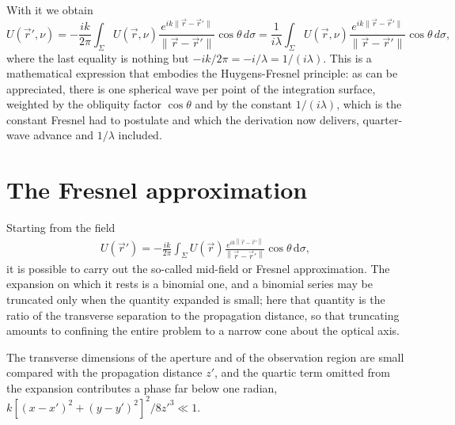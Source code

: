 		With it we obtain
		\begin{equation}\label{eq:RSfinal}
			U(\vec{r}',\nu) = -\dfrac{ik}{2\pi} \int_{\Sigma} U(\vec{r},\nu)\dfrac{e^{ik\|\vec{r}-\vec{r}'\|}}{\|\vec{r}-\vec{r}'\|} \cos\theta\,d\sigma = \dfrac{1}{i\lambda} \int_{\Sigma} U(\vec{r},\nu)\dfrac{e^{ik\|\vec{r}-\vec{r}'\|}}{\|\vec{r}-\vec{r}'\|} \cos\theta\,d\sigma,
		\end{equation}
		where the last equality is nothing but $-ik/2\pi = -i/\lambda = 1/(i\lambda)$. This is a mathematical expression that embodies the Huygens-Fresnel principle: as can be appreciated, there is one spherical wave per point of the integration surface, weighted by the obliquity factor $\cos\theta$ and by the constant $1/(i\lambda)$, which is the constant Fresnel had to postulate and which the derivation now delivers, quarter-wave advance and $1/\lambda$ included.

\section{The Fresnel approximation}

Starting from the field
\begin{align}
	U(\vec{r}') = -\frac{ik}{2\pi}\int_{\Sigma} U(\vec{r}) \frac{e^{ik \left\| \vec{r} - \vec{r}' \right\|}}{\left\| \vec{r} - \vec{r}' \right\|} \cos\theta \, \mathrm{d}\sigma,
\end{align}
it is possible to carry out the so-called mid-field or Fresnel approximation. The expansion on which it rests is a binomial one, and a binomial series may be truncated only when the quantity expanded is small; here that quantity is the ratio of the transverse separation to the propagation distance, so that truncating amounts to confining the entire problem to a narrow cone about the optical axis.

\begin{Assumption}
	The transverse dimensions of the aperture and of the observation region are small compared with the propagation distance $z'$, and the quartic term omitted from the expansion contributes a phase far below one radian, $k\left[(x-x')^{2}+(y-y')^{2}\right]^{2}/8z'^{3} \ll 1$.
\end{Assumption}


